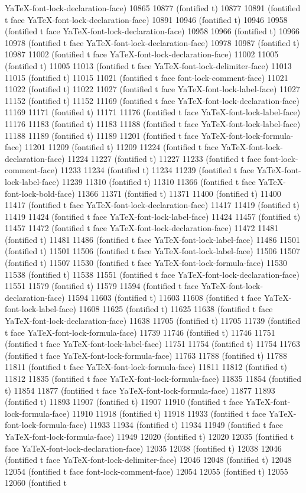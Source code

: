 YaTeX-font-lock-declaration-face) 10865 10877 (fontified t) 10877 10891 (fontified t face YaTeX-font-lock-declaration-face) 10891 10946 (fontified t) 10946 10958 (fontified t face YaTeX-font-lock-declaration-face) 10958 10966 (fontified t) 10966 10978 (fontified t face YaTeX-font-lock-declaration-face) 10978 10987 (fontified t) 10987 11002 (fontified t face YaTeX-font-lock-declaration-face) 11002 11005 (fontified t) 11005 11013 (fontified t face YaTeX-font-lock-delimiter-face) 11013 11015 (fontified t) 11015 11021 (fontified t face font-lock-comment-face) 11021 11022 (fontified t) 11022 11027 (fontified t face YaTeX-font-lock-label-face) 11027 11152 (fontified t) 11152 11169 (fontified t face YaTeX-font-lock-declaration-face) 11169 11171 (fontified t) 11171 11176 (fontified t face YaTeX-font-lock-label-face) 11176 11183 (fontified t) 11183 11188 (fontified t face YaTeX-font-lock-label-face) 11188 11189 (fontified t) 11189 11201 (fontified t face YaTeX-font-lock-formula-face) 11201 11209 (fontified t) 11209 11224 (fontified t face YaTeX-font-lock-declaration-face) 11224 11227 (fontified t) 11227 11233 (fontified t face font-lock-comment-face) 11233 11234 (fontified t) 11234 11239 (fontified t face YaTeX-font-lock-label-face) 11239 11310 (fontified t) 11310 11366 (fontified t face YaTeX-font-lock-bold-face) 11366 11371 (fontified t) 11371 11400 (fontified t) 11400 11417 (fontified t face YaTeX-font-lock-declaration-face) 11417 11419 (fontified t) 11419 11424 (fontified t face YaTeX-font-lock-label-face) 11424 11457 (fontified t) 11457 11472 (fontified t face YaTeX-font-lock-declaration-face) 11472 11481 (fontified t) 11481 11486 (fontified t face YaTeX-font-lock-label-face) 11486 11501 (fontified t) 11501 11506 (fontified t face YaTeX-font-lock-label-face) 11506 11507 (fontified t) 11507 11530 (fontified t face YaTeX-font-lock-formula-face) 11530 11538 (fontified t) 11538 11551 (fontified t face YaTeX-font-lock-declaration-face) 11551 11579 (fontified t) 11579 11594 (fontified t face YaTeX-font-lock-declaration-face) 11594 11603 (fontified t) 11603 11608 (fontified t face YaTeX-font-lock-label-face) 11608 11625 (fontified t) 11625 11638 (fontified t face YaTeX-font-lock-declaration-face) 11638 11705 (fontified t) 11705 11739 (fontified t face YaTeX-font-lock-formula-face) 11739 11746 (fontified t) 11746 11751 (fontified t face YaTeX-font-lock-label-face) 11751 11754 (fontified t) 11754 11763 (fontified t face YaTeX-font-lock-formula-face) 11763 11788 (fontified t) 11788 11811 (fontified t face YaTeX-font-lock-formula-face) 11811 11812 (fontified t) 11812 11835 (fontified t face YaTeX-font-lock-formula-face) 11835 11854 (fontified t) 11854 11877 (fontified t face YaTeX-font-lock-formula-face) 11877 11893 (fontified t) 11893 11907 (fontified t) 11907 11910 (fontified t face YaTeX-font-lock-formula-face) 11910 11918 (fontified t) 11918 11933 (fontified t face YaTeX-font-lock-formula-face) 11933 11934 (fontified t) 11934 11949 (fontified t face YaTeX-font-lock-formula-face) 11949 12020 (fontified t) 12020 12035 (fontified t face YaTeX-font-lock-declaration-face) 12035 12038 (fontified t) 12038 12046 (fontified t face YaTeX-font-lock-delimiter-face) 12046 12048 (fontified t) 12048 12054 (fontified t face font-lock-comment-face) 12054 12055 (fontified t) 12055 12060 (fontified t 